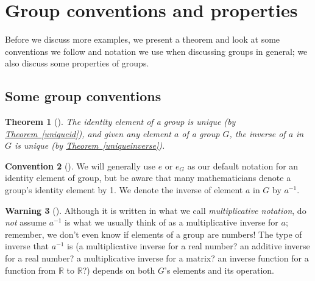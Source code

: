 \documentclass[10pt,openany,oneside]{book}
\theoremstyle{plain}
\newtheorem{theorem}{Theorem}[section]
\theoremstyle{definition}
\theoremstyle{definition}
\newtheorem{observation}[theorem]{Convention}
\newtheorem{warning}[theorem]{Warning}
\theoremstyle{definition}
\theoremstyle{definition}
\numberwithin{equation}{section}
\def\R{\mathbb{R}}
\begin{document}
\section[{Group conventions and properties}]{Group conventions and properties}\label{section-7}
Before we discuss more examples, we present a theorem and look at some conventions we follow and notation we use when discussing groups in general; we also discuss some properties of groups.%
\typeout{************************************************}
\typeout{************************************************}
\subsection[{Some group conventions}]{Some group conventions}\label{subsection-1}
\begin{theorem}[{}]\label{theorem-9}
The identity element of a group is unique (by \hyperref[uniqueid]{Theorem~\ref{uniqueid}}), and given any element \(a\) of a group \(G\), the inverse of \(a\) in \(G\) is unique (by \hyperref[uniqueinverse]{Theorem~\ref{uniqueinverse}}).%
\end{theorem}
\begin{observation}[]\label{observation-1}
\label{notation-35}
 \label{notation-36}
We will generally use \(e\) or \(e_G\) as our default notation for an identity element of group, but be aware that many mathematicians denote a group's identity element by 1. We  denote the inverse of element \(a\) in \(G\) by \(a^{-1}\).%
\end{observation}
\begin{warning}[]\label{warning-6}
Although it is written in what we call  \emph{multiplicative notation}, do \emph{not} assume \(a^{-1}\) is what we usually think of as a multiplicative inverse for \(a\); remember, we don't even know if elements of a group are numbers! The type of inverse that \(a^{-1}\) is (a multiplicative inverse for a real number? an additive inverse for a real number? a multiplicative inverse for a matrix? an inverse function for a function from \(\R\) to \(\R\)?) depends on both \(G\)'s elements and its operation.%
\end{warning}
\end{document}
